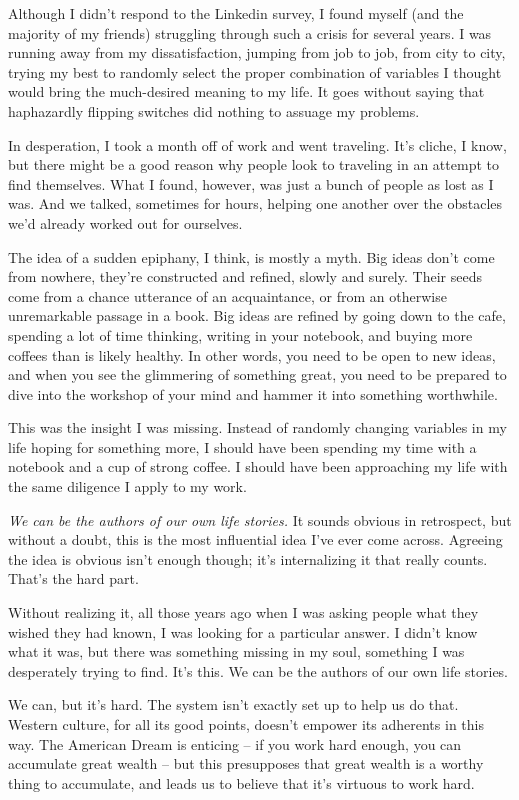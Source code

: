 \documentclass[]{book}
\begin{document}
Although I didn't respond to the Linkedin survey, I found myself (and the
majority of my friends) struggling through such a crisis for several years. I
was running away from my dissatisfaction, jumping from job to job, from city to
city, trying my best to randomly select the proper combination of variables I
thought would bring the much-desired meaning to my life. It goes without saying
that haphazardly flipping switches did nothing to assuage my problems.

In desperation, I took a month off of work and went traveling. It's cliche, I
know, but there might be a good reason why people look to traveling in an
attempt to find themselves. What I found, however, was just a bunch of people as
lost as I was. And we talked, sometimes for hours, helping one another over the
obstacles we'd already worked out for ourselves.

The idea of a sudden epiphany, I think, is mostly a myth. Big ideas don't come
from nowhere, they're constructed and refined, slowly and surely. Their seeds
come from a chance utterance of an acquaintance, or from an otherwise
unremarkable passage in a book. Big ideas are refined by going down to the cafe,
spending a lot of time thinking, writing in your notebook, and buying more
coffees than is likely healthy.  In other words, you need to be open to new
ideas, and when you see the glimmering of something great, you need to be
prepared to dive into the workshop of your mind and hammer it into something
worthwhile.

This was the insight I was missing. Instead of randomly changing variables in my
life hoping for something more, I should have been spending my time with a
notebook and a cup of strong coffee. I should have been approaching my life with
the same diligence I apply to my work.

\emph{We can be the authors of our own life stories.} It sounds obvious in
retrospect, but without a doubt, this is the most influential idea I've ever
come across. Agreeing the idea is obvious isn't enough though; it's
internalizing it that really counts. That's the hard part.

Without realizing it, all those years ago when I was asking people what they
wished they had known, I was looking for a particular answer. I didn't know what
it was, but there was something missing in my soul, something I was desperately
trying to find. It's this. We can be the authors of our own life stories.

We can, but it's hard. The system isn't exactly set up to help us do that.
Western culture, for all its good points, doesn't empower its adherents in this
way.  The American Dream is enticing -- if you work hard
enough, you can accumulate great wealth -- but this presupposes that great
wealth is a worthy thing to accumulate, and leads us to believe that it's
virtuous to work hard.
\end{document}
